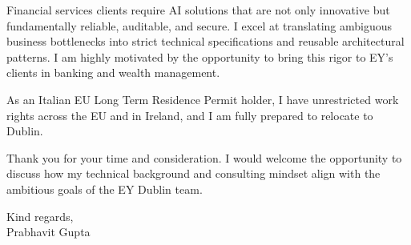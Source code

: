 \documentclass[a4paper,11pt]{article}
\begin{document}
Financial services clients require AI solutions that are not only innovative but fundamentally reliable, auditable, and secure. I excel at translating ambiguous business bottlenecks into strict technical specifications and reusable architectural patterns. I am highly motivated by the opportunity to bring this rigor to EY's clients in banking and wealth management. 

As an Italian EU Long Term Residence Permit holder, I have unrestricted work rights across the EU and in Ireland, and I am fully prepared to relocate to Dublin. 

Thank you for your time and consideration. I would welcome the opportunity to discuss how my technical background and consulting mindset align with the ambitious goals of the EY Dublin team.

Kind regards,\\[2em]

Prabhavit Gupta
\end{document}
